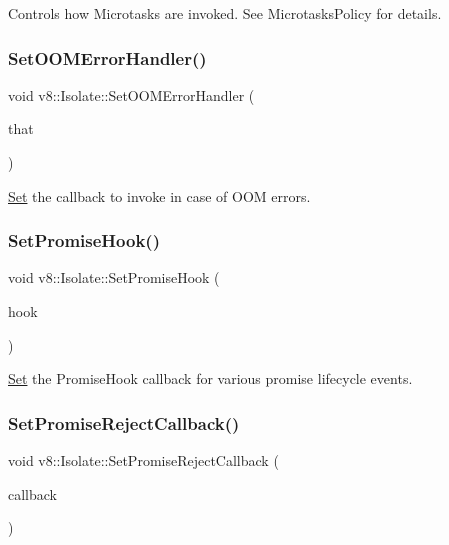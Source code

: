 Controls how Microtasks are invoked. See Microtasks\+Policy for details. \mbox{\label{classv8_1_1Isolate_a767206403c9b6cb8018a7121f8b5f051}} 
\subsubsection{\texorpdfstring{Set\+O\+O\+M\+Error\+Handler()}{SetOOMErrorHandler()}}
{\footnotesize\ttfamily void v8\+::\+Isolate\+::\+Set\+O\+O\+M\+Error\+Handler (\begin{DoxyParamCaption}\item[{O\+O\+M\+Error\+Callback}]{that }\end{DoxyParamCaption})}

\mbox{\hyperlink{classv8_1_1Set}{Set}} the callback to invoke in case of O\+OM errors. \mbox{\label{classv8_1_1Isolate_a707579804058f6d831fe091682e31274}} 
\subsubsection{\texorpdfstring{Set\+Promise\+Hook()}{SetPromiseHook()}}
{\footnotesize\ttfamily void v8\+::\+Isolate\+::\+Set\+Promise\+Hook (\begin{DoxyParamCaption}\item[{Promise\+Hook}]{hook }\end{DoxyParamCaption})}

\mbox{\hyperlink{classv8_1_1Set}{Set}} the Promise\+Hook callback for various promise lifecycle events. \mbox{\label{classv8_1_1Isolate_a702f0ba4e5dee8a98aeb92239d58784e}} 
\subsubsection{\texorpdfstring{Set\+Promise\+Reject\+Callback()}{SetPromiseRejectCallback()}}
{\footnotesize\ttfamily void v8\+::\+Isolate\+::\+Set\+Promise\+Reject\+Callback (\begin{DoxyParamCaption}\item[{Promise\+Reject\+Callback}]{callback }\end{DoxyParamCaption})}

